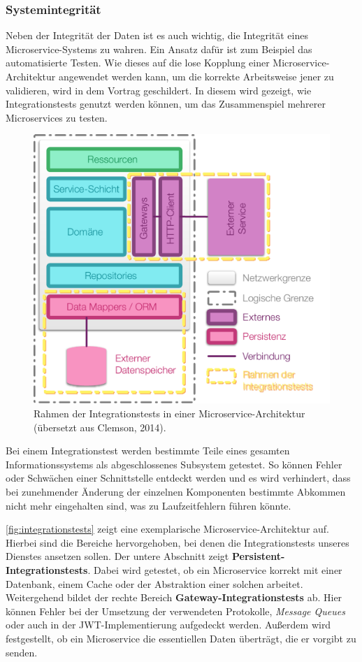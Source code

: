 \subsubsection{Systemintegrität}

Neben der Integrität der Daten ist es auch wichtig, die Integrität eines Microservice-Systems zu wahren. Ein Ansatz dafür ist zum Beispiel das automatisierte Testen. Wie dieses auf die lose Kopplung einer Microservice-Architektur angewendet werden kann, um die korrekte Arbeitsweise jener zu validieren, wird in dem Vortrag \cite{Clemson14} geschildert. In diesem wird gezeigt, wie Integrationstests genutzt werden können, um das Zusammenspiel mehrerer Microservices zu testen.

\begin{figure}[h]
	\centering
	\includegraphics[width=.6\linewidth]{img/inte}
	\caption{Rahmen der Integrationstests in einer Microservice-Architektur (übersetzt aus Clemson, 2014).}
	\label{fig:integrationstests}
\end{figure}

Bei einem Integrationstest werden bestimmte Teile eines gesamten Informationssystems als abgeschlossenes Subsystem getestet. So können Fehler oder Schwächen einer Schnittstelle entdeckt werden und es wird verhindert, dass bei zunehmender Änderung der einzelnen Komponenten bestimmte Abkommen nicht mehr eingehalten sind, was zu Laufzeitfehlern führen könnte.

\autoref{fig:integrationstests} zeigt eine exemplarische Microservice-Architektur auf. Hierbei sind die Bereiche hervorgehoben, bei denen die Integrationstests unseres Dienstes ansetzen sollen. Der untere Abschnitt zeigt \textbf{Persistent-Integrationstests}. Dabei wird getestet, ob ein Microservice korrekt mit einer Datenbank, einem Cache oder der Abstraktion einer solchen arbeitet. Weitergehend bildet der rechte Bereich \textbf{Gateway-Integrationstests} ab. Hier können Fehler bei der Umsetzung der verwendeten Protokolle, \textit{Message Queues} oder auch in der JWT-Implementierung aufgedeckt werden. Außerdem wird festgestellt, ob ein Microservice die essentiellen Daten überträgt, die er vorgibt zu senden.


